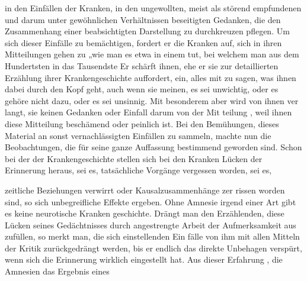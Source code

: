 \documentclass[twoside=true,titlepage=false,open=any, parskip=never, fontsize=10pt, headings=small, chapterprefix=false, appendixprefix=false]{scrbook}
\begin{document}
 in den Einfällen der Kranken,  in den ungewollten,
 meist als störend empfundenen und darum unter
               gewöhnlichen
 Verhältnissen beseitigten Gedanken, die den Zusammenhang einer
               beabsichtigten Darstellung zu durchkreuzen pflegen. Um sich
 dieser Einfälle zu
               bemächtigen, fordert er die Kranken auf, sich
 in ihren Mitteilungen gehen zu „wie man es etwa in
 einem  tut, bei welchem man aus dem Hundertsten in
 das Tausendste  Er schärft ihnen, ehe er sie zur detaillierten
 Erzählung ihrer Krankengeschichte auffordert, ein, alles mit
               zu
 sagen, was ihnen dabei durch den Kopf geht, auch wenn sie 
meinen, es sei unwichtig, oder es gehöre nicht dazu, oder es sei
               unsinnig. Mit besonderem  aber wird von ihnen ver
langt,  sie keinen Gedanken oder Einfall darum von der Mit
teilung , weil ihnen diese Mitteilung beschämend
 oder peinlich ist. Bei den
               Bemühungen, dieses Material an sonst
 vernachlässigten Einfällen zu sammeln,
               machte nun  die
 Beobachtungen, die für
               seine ganze Auffassung bestimmend
 geworden sind. Schon bei der  der Krankengeschichte
 stellen
               sich bei den Kranken Lücken der Erinnerung heraus,
 sei es,  tatsächliche Vorgänge vergessen worden, sei es, 

 zeitliche Beziehungen verwirrt oder Kausalzusammenhänge zer
rissen worden sind, so  sich unbegreifliche Effekte ergeben.
 Ohne Amnesie irgend einer Art gibt es keine neurotische
                  Kranken
geschichte. Drängt man den Erzählenden, diese Lücken
               seines
 Gedächtnisses durch angestrengte Arbeit der Aufmerksamkeit aus
zufüllen, so merkt man,  die  sich einstellenden Ein
fälle von ihm mit allen Mitteln der
               Kritik zurückgedrängt
 werden, bis er endlich das direkte Unbehagen verspürt,
               wenn
 sich die Erinnerung wirklich eingestellt hat. Aus dieser Erfahrung
, die Amnesien das Ergebnis eines 
\end{document}
